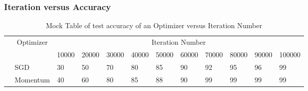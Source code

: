 \documentclass{article}
\begin{document}
\subsubsection{Iteration versus Accuracy}
\label{sec:IvsTA}
	\begin{table}[H]
		\begin{tabular}{l|l|l|l|l|l|l|l|l|l|l|l|}
			\cline{2-12}
			& \multicolumn{1}{c|}{\multirow{2}{*}{Optimizer}} & \multicolumn{10}{c|}{Iteration Number}                                         \\ \cline{3-12} 
			& \multicolumn{1}{c|}{}                           & 10000 & 20000 & 30000 & 40000 & 50000 & 60000 & 70000 & 80000 & 90000 & 100000 \\ \cline{2-12} 
			& SGD                                             & 30    & 50    & 70    & 80    & 85    & 90    & 92    & 95    & 96    & 99     \\ \cline{2-12} 
			& Momentum                                        & 40    & 60    & 80    & 85    & 88    & 90    & 99    & 99    & 99    & 99     \\ \cline{2-12} 
		\end{tabular}
		\caption{Mock Table of test accuracy of an Optimizer versus Iteration Number}
	\end{table}
\end{document}
